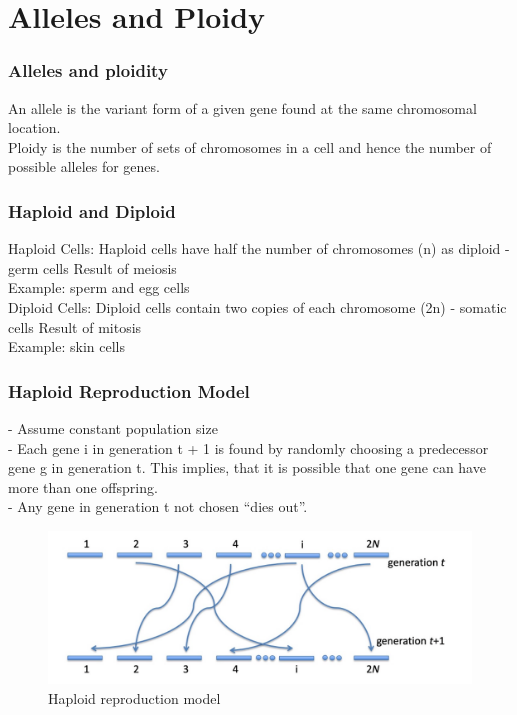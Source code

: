 \documentclass{beamer}
\begin{document}
    \section{Alleles and Ploidy}
    \begin{frame}
        \frametitle{Alleles and ploidity}
        An allele is the variant form of a given gene found at the same chromosomal location.
        \\
        Ploidy is the number of sets of chromosomes in a cell and hence the number of possible alleles for genes.
    \end{frame}

    \begin{frame}
        \frametitle{Haploid and Diploid}
        Haploid Cells:
        Haploid cells have half the number of chromosomes (n) as diploid - germ cells Result of meiosis\\
        Example: sperm and egg cells\\
        Diploid Cells:
        Diploid cells contain two copies of each chromosome (2n) - somatic cells Result of mitosis\\
        Example: skin cells
    \end{frame}

    \begin{frame}
        \frametitle{Haploid Reproduction Model}
       - Assume constant population size\\
       - Each gene i in generation t + 1 is found by randomly choosing a predecessor gene g in generation t. This implies, that it is possible that one gene can have more than one offspring.\\
       - Any gene in generation t not chosen “dies out”.
        \begin{figure}
         \includegraphics[width=\textwidth]{haploidRep.png}
            \caption{Haploid reproduction model}
        \end{figure}
    \end{frame}
\end{document}
